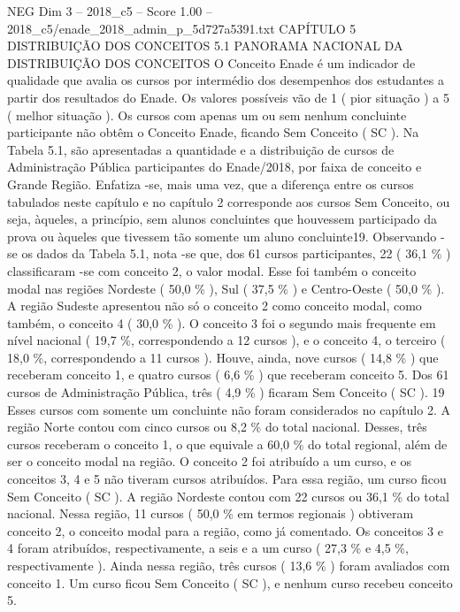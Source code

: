 \begin{textsample}{NEG Dim 3 – 2018\_c5 – Score 1.00 – 2018\_c5/enade\_2018\_admin\_p\_5d727a5391.txt}  \label{ex:f3_neg_100}
CAPÍTULO 5 DISTRIBUIÇÃO DOS CONCEITOS 5.1 PANORAMA NACIONAL DA DISTRIBUIÇÃO DOS CONCEITOS O Conceito Enade é um indicador de qualidade que avalia os cursos por intermédio dos desempenhos dos estudantes a partir dos resultados do Enade.
Os valores possíveis vão de 1 ( pior situação ) a 5 ( melhor situação ).
Os cursos com apenas um ou sem nenhum concluinte participante não obtêm o Conceito Enade, ficando Sem Conceito ( SC ).
Na Tabela 5.1, são apresentadas a quantidade e a distribuição de cursos de Administração Pública participantes do Enade/2018, por faixa de conceito e Grande Região.
Enfatiza -se, mais uma vez, que a diferença entre os cursos tabulados neste capítulo e no capítulo 2 corresponde aos cursos Sem Conceito, ou seja, àqueles, a princípio, sem alunos concluintes que houvessem participado da prova ou àqueles que tivessem tão somente um aluno concluinte19.
Observando -se os dados da Tabela 5.1, nota -se que, dos 61 cursos participantes, 22 ( 36,1 \% ) classificaram -se com conceito 2, o valor modal.
Esse foi também o conceito modal nas regiões Nordeste ( 50,0 \% ), Sul ( 37,5 \% ) e Centro-Oeste ( 50,0 \% ).
A região Sudeste apresentou não só o conceito 2 como conceito modal, como também, o conceito 4 ( 30,0 \% ).
O conceito 3 foi o segundo mais frequente em nível nacional ( 19,7 \%, correspondendo a 12 cursos ), e o conceito 4, o terceiro ( 18,0 \%, correspondendo a 11 cursos ).
Houve, ainda, nove cursos ( 14,8 \% ) que receberam conceito 1, e quatro cursos ( 6,6 \% ) que receberam conceito 5.
Dos 61 cursos de Administração Pública, três ( 4,9 \% ) ficaram Sem Conceito ( SC ). 19 Esses cursos com somente um concluinte não foram considerados no capítulo 2.
A região Norte contou com cinco cursos ou 8,2 \% do total nacional.
Desses, três cursos receberam o conceito 1, o que equivale a 60,0 \% do total regional, além de ser o conceito modal na região.
O conceito 2 foi atribuído a um curso, e os conceitos 3, 4 e 5 não tiveram cursos atribuídos.
Para essa região, um curso ficou Sem Conceito ( SC ).
A região Nordeste contou com 22 cursos ou 36,1 \% do total nacional.
Nessa região, 11 cursos ( 50,0 \% em termos regionais ) obtiveram conceito 2, o conceito modal para a região, como já comentado.
Os conceitos 3 e 4 foram atribuídos, respectivamente, a seis e a um curso ( 27,3 \% e 4,5 \%, respectivamente ).
Ainda nessa região, três cursos ( 13,6 \% ) foram avaliados com conceito 1.
Um curso ficou Sem Conceito ( SC ), e nenhum curso recebeu conceito 5.

\end{textsample}
